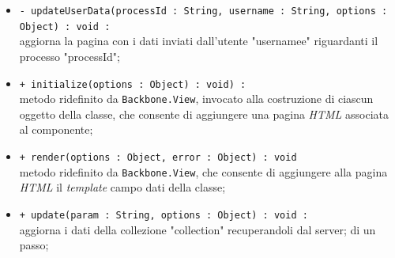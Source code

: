 \begin{flushleft}
\begin{itemize}
\begin{sloppypar}
\begin{itemize}
  \item \texttt{- updateUserData(processId : String, username : String, options : Object) : void :}\\ aggiorna la pagina con i dati inviati dall'utente "usernamee" riguardanti il processo "processId";
\item \texttt{+ initialize(options : Object) : void) :}\\ metodo ridefinito da \texttt{Backbone.View}, invocato alla costruzione di ciascun oggetto della classe, che consente di aggiungere una pagina \textit{HTML} associata al componente;
\item \texttt{+ render(options : Object, error : Object) : void}\\ metodo ridefinito da \texttt{Backbone.View}, che consente di aggiungere alla pagina \textit{HTML} il \textit{template} campo dati della classe;
\item \texttt{+ update(param : String, options : Object) : void :}\\ aggiorna i dati della collezione "collection" recuperandoli dal server; di un passo;
\end{itemize}
\end{sloppypar}
\end{itemize}
\end{flushleft}